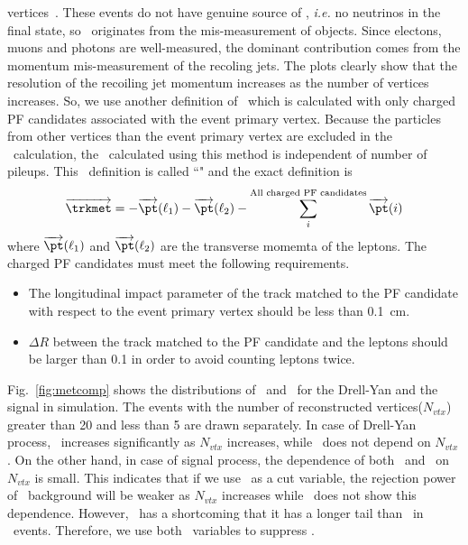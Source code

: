 vertices~\cite{CMS-PAS-JME-12-002}. These events do not have genuine source of 
\met, \textit{i.e.} no neutrinos in the final state, so \met\ originates from 
the mis-measurement of objects. Since electons, muons 
and photons are well-measured, the dominant contribution comes from the momentum 
mis-measurement of the recoling jets. The plots clearly show that the resolution 
of the recoiling jet momentum increases as the number of vertices increases.   
So, we use another definition of \met\ which is calculated with only charged 
PF candidates associated with the event primary vertex. Because the particles from 
other vertices than the event primary vertex are excluded in the \met\ calculation,
the \met\ calculated using this method is independent of number of pileups.  
This \met\ definition is called ``\trkmet" and the exact definition is
\begin{eqnarray} 
\overrightarrow{\trkmet} 
= 
- \overrightarrow{\pt} (\ell_1)  
- \overrightarrow{\pt} (\ell_2)  
- \sum^{\textrm{All charged PF candidates}}_i \overrightarrow{\pt}(i)
\end{eqnarray} 
where $\overrightarrow{\pt} (\ell_1)$ and $\overrightarrow{\pt} (\ell_2)$
are the transverse momemta of the leptons. The charged PF candidates must 
meet the following requirements.
\begin{itemize}
\item The longitudinal impact parameter of the track matched to the PF candidate 
      with respect to the event primary vertex should be less than 0.1~cm. 
\item $\Delta R$ between the track matched to the PF candidate and the leptons 
      should be larger than 0.1 in order to avoid counting leptons twice. 
\end{itemize}

Fig.~\ref{fig:metcomp} shows the distributions of \pfmet\ and \trkmet\ 
for the Drell-Yan and the signal in simulation. The events with the number 
of reconstructed vertices($N_{vtx}$) greater than 20 and less than 5 
are drawn separately. In case of Drell-Yan process, \pfmet\ increases 
significantly as $N_{vtx}$ increases, while \trkmet\ does not depend 
on $N_{vtx}$. 
On the other hand, in case of signal process, the dependence 
of both \pfmet\ and \trkmet\ on $N_{vtx}$ is small. 
This indicates that if we use \pfmet\ as a cut variable, 
the rejection power of \dyll\ background will be weaker 
as $N_{vtx}$ increases while \trkmet\ does not show this 
dependence. However, \trkmet\ has a shortcoming that it has 
a longer tail than \pfmet\ in \dyll\ events. 
Therefore, we use both \met\ variables to suppress \dyll.


